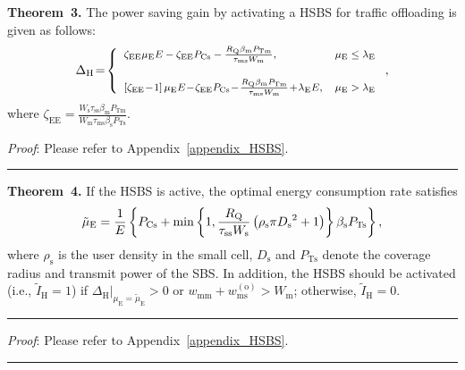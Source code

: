 \documentclass[12pt, draftclsnofoot,onecolumn]{IEEEtran}
\begin{document}
\textbf{Theorem~3.} The power saving gain by activating a HSBS for traffic offloading is given as follows:
\begin{equation}\label{eq_gain_hsbs_2} \footnotesize
    \Delta_\mathrm{H} \!=\! \left\{ \begin{array}{ll} \zeta_\mathrm{EE} \mu_\mathrm{E} E - \zeta_\mathrm{EE} P_{\mathrm{Cs}} - \frac{R_\mathrm{Q}\beta_\mathrm{m}P_\mathrm{Tm}}{\tau_\mathrm{ms} W_\mathrm{m}}, &\mu_\mathrm{E}\leq\lambda_\mathrm{E}\\
    \vspace{0.05in}\\
    \left[ \zeta_\mathrm{EE} \!-\!1 \right] \mu_\mathrm{E} E \!-\! \zeta_\mathrm{EE}  P_{\mathrm{Cs}} \!-\! \frac{R_\mathrm{Q} \beta_\mathrm{m}P_\mathrm{Tm}}{\tau_\mathrm{ms} W_\mathrm{m}} \!+\! \lambda_\mathrm{E} E,  & \mu_\mathrm{E}>\lambda_\mathrm{E} \end{array} \right. ,
\end{equation}
where $\zeta_\mathrm{EE} = \frac{W_\mathrm{s}\tau_\mathrm{ss} \beta_\mathrm{m} P_\mathrm{Tm}} {W_\mathrm{m} \tau_\mathrm{ms} \beta_\mathrm{s} P_\mathrm{Ts}}$.

\emph{Proof}: Please refer to Appendix~\ref{appendix_HSBS}. \hfill \rule{4pt}{8pt}

\textbf{Theorem~4.} If the HSBS is active, the optimal energy consumption rate satisfies
\begin{equation}\label{eq_mu_opt_HSBS} \small
    \tilde{\mu}_\mathrm{E} = \frac{1}{E} \left\{ P_{\mathrm{Cs}}+ \min \left\{1, \frac{R_\mathrm{Q}}{\tau_\mathrm{ss} W_\mathrm{s}}\left(\rho_\mathrm{s}\pi {D_\mathrm{s}}^2 +1 \right) \right\} \beta_\mathrm{s} P_\mathrm{Ts} \right\},
\end{equation}
where $\rho_\mathrm{s}$ is the user density in the small cell, $D_\mathrm{s}$ and $P_\mathrm{Ts}$ denote the coverage radius and transmit power of the SBS.
In addition, the HSBS should be activated (i.e., $\tilde{I}_\mathrm{H}=1$) if $\Delta_\mathrm{H}|_{{\mu}_\mathrm{E}=\tilde{\mu}_\mathrm{E}}>0$ or $w_\mathrm{mm}+w_\mathrm{ms}^{(\mathrm{o})}>W_\mathrm{m}$; otherwise, $\tilde{I}_\mathrm{H}=0$.
\hfill \rule{4pt}{8pt}

\emph{Proof}: Please refer to Appendix~\ref{appendix_HSBS}. \hfill \rule{4pt}{8pt}
\end{document}

